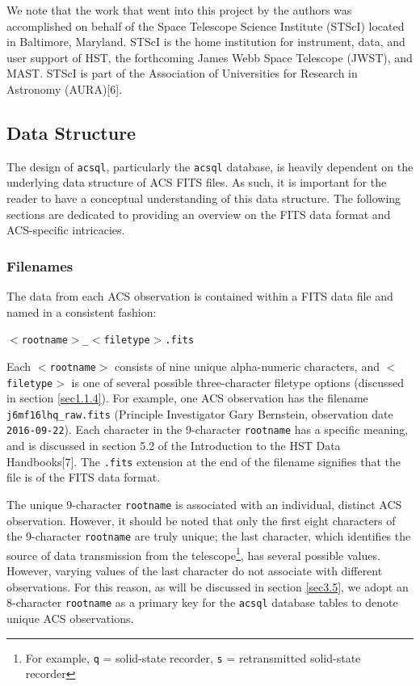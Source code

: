 \documentclass[10pt,journal,compsoc]{IEEEtran}
\begin{document}
We note that the work that went into this project by the authors was accomplished on behalf of the Space Telescope Science Institute (STScI)
located in Baltimore, Maryland.  STScI is the home institution for instrument, data, and user support of HST, the forthcoming James Webb Space
Telescope (JWST), and MAST.  STScI is part of the Association of Universities for Research in Astronomy (AURA)[6].


\subsection{Data Structure} \label{sec1.1}

The design of \texttt{acsql}, particularly the \texttt{acsql} database, is heavily dependent on the underlying data structure of ACS FITS files.
As such, it is important for the reader to have a conceptual understanding of this data structure.  The following sections are dedicated to
providing an overview on the FITS data format and ACS-specific intricacies.


\subsubsection{Filenames} \label{sec1.1.1}

The data from each ACS observation is contained within a FITS data file and named in a consistent fashion:\newline

\texttt{$<$rootname$>$\_$<$filetype$>$.fits}\newline

\noindent Each \texttt{$<$rootname$>$} consists of nine unique alpha-numeric characters, and \texttt{$<$filetype$>$} is one of several possible
three-character filetype options (discussed in section \ref{sec1.1.4}).  For example, one ACS observation has the filename \texttt{j6mf16lhq\_raw.fits}
(Principle Investigator Gary Bernstein, observation date \texttt{2016-09-22}).  Each character in the 9-character \texttt{rootname} has a specific meaning,
and is discussed in section 5.2 of the Introduction to the HST Data Handbooks[7].  The \texttt{.fits} extension at the end of the filename signifies
that the file is of the FITS data format.

The unique 9-character \texttt{rootname} is associated with an individual, distinct ACS observation. However, it should be noted that only the first
eight characters of the 9-character \texttt{rootname} are truly unique; the last character, which identifies the source of data transmission from the
telescope\footnote{For example, \texttt{q} = solid-state recorder, \texttt{s} = retransmitted solid-state recorder}, has several possible values.  However,
varying values of the last character do not associate with different observations.  For this reason, as will be discussed in section \ref{sec3.5}, we adopt
an 8-character \texttt{rootname} as a primary key for the \texttt{acsql} database tables to denote unique ACS observations.
\end{document}
